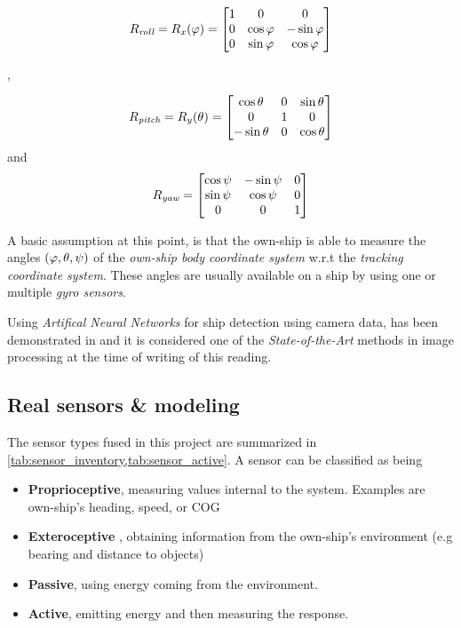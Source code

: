 \begin{description}
\begin{equation}
R_{\textit{roll}}= R_x({\varphi}) =
\begin{bmatrix}
1 &0 &0\\
0 &\cos{\varphi} &-\sin {\varphi}\\
0 &\sin {\varphi} &\cos {\varphi}
\end{bmatrix}
\end{equation}


,


\begin{equation}
R_{\textit{pitch}}= R_y({\theta}) =
\begin{bmatrix}
\cos{\theta} &0 &\sin {\theta}\\
0 &1 &0\\
-\sin {\theta} &0 &\cos{\theta}
\end{bmatrix}
\end{equation}
and
\begin{equation}\label{eq:rot_yaw}
R_{\textit{yaw}}= \left[\begin{matrix}\cos{\psi} &-\sin{\psi}&0\\\sin{\psi} &\cos {\psi}&0\\0&0&1\end{matrix}\right]
\end{equation}

A basic assumption at this point, is that the own-ship is able to measure the angles $({\varphi},{\theta},{\psi})$ of the \emph{own-ship body coordinate system} w.r.t the \emph{tracking coordinate system}. These angles are usually available on a ship by using one or multiple \emph{gyro sensors}.

\end{description}

 Using \emph{Artifical Neural Networks} for ship detection using camera data, has been demonstrated in \cite{Blanke2020} and it is considered one of the \emph{State-of-the-Art} methods in image processing at the time of writing of this reading.

\subsection{Real sensors \& modeling}

The sensor types fused in this project are summarized in \cref{tab:sensor_inventory,tab:sensor_active}. A sensor can be classified as being

\begin{itemize}
\item\textbf{Proprioceptive}, measuring values internal to
	the system. Examples are own-ship's heading, speed, or COG
	\item\textbf{Exteroceptive} , obtaining information from the own-ship's environment (e.g bearing and distance to objects)
	\item\textbf{Passive}, using energy coming from the
	environment. 
	\item\textbf{Active}, emitting energy and then measuring the response.
\end{itemize}
 

